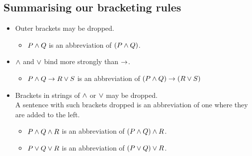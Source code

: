 \subsection{Summarising our bracketing rules}\label{sec:TFLBrackets}
\begin{definition}
	\begin{itemize}
		\item Outer brackets may be dropped.
		\begin{itemize}
			\item []
		$P\mathbin{\wedge} Q$ is an abbreviation of $(P\mathbin{\wedge} Q)$.
		\end{itemize}
		\item $\mathbin{\wedge}$ and $\vee$ bind more strongly than $\rightarrow$.
		\begin{itemize}
			\item [] $P\mathbin{\wedge} Q\rightarrow R\vee S$  is an abbreviation of  $(P\mathbin{\wedge} Q)\rightarrow (R\vee S)$
		\end{itemize}
		\item Brackets in strings of $\mathbin{\wedge}$ or $\vee$ may be dropped. \\A sentence with such brackets dropped is an abbreviation of one where they are added to the left.
		\begin{itemize}
			\item []$P\mathbin{\wedge} Q\mathbin{\wedge} R$  is an abbreviation of  $(P\mathbin{\wedge} Q)\mathbin{\wedge} R$.\item[]
		$P\vee Q\vee R$  is an abbreviation of  $(P\vee Q)\vee R$.
		\end{itemize}
	\end{itemize} 
\end{definition}






